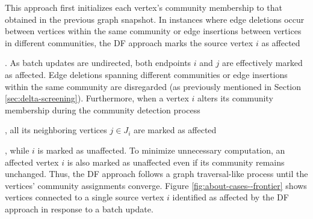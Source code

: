 This approach first initializes each vertex's community membership to that obtained in the previous graph snapshot. In instances where edge deletions occur between vertices within the same community or edge insertions between vertices in different communities, the DF approach marks the source vertex $i$ as affected. As batch updates are undirected, both endpoints $i$ and $j$ are effectively marked as affected. Edge deletions spanning different communities or edge insertions within the same community are disregarded (as previously mentioned in Section \ref{sec:delta-screening}). Furthermore, when a vertex $i$ alters its community membership during the community detection process, all its neighboring vertices $j \in J_i$ are marked as affected, while $i$ is marked as unaffected. To minimize unnecessary computation, an affected vertex $i$ is also marked as unaffected even if its community remains unchanged. Thus, the DF approach follows a graph traversal-like process until the vertices' community assignments converge. Figure \ref{fig:about-cases--frontier} shows vertices connected to a single source vertex $i$ identified as affected by the DF approach in response to a batch update.


